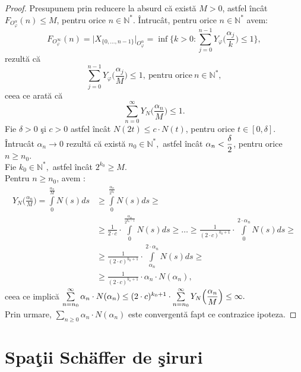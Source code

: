 \documentclass[ a4paper, 12pt]{report}
\theoremstyle{definition}
\theoremstyle{remark}
\numberwithin{equation}{section}
\begin{document}
\begin{proof}
Presupunem prin reducere la absurd c\u a exist\u a $M > 0$, astfel \^inc\^at $F_{O_{\varphi}^{\alpha}}(n) \leq M$, pentru orice $n \in \mathbb{N}^{\ast}$. \^Intruc\^at, pentru orice $n \in \mathbb{N}^{\ast}$ avem: \[F_{O_{\varphi}^{\infty}}(n) = \lvert X_{\{0,\ldots,n-1 \}} \rvert_{O_{\varphi}^{\alpha}} = \inf\Big\{ k>0 : \sum\limits_{j=0}^{n-1} Y_\varphi \Big(\frac{\alpha_j}{k}\Big) \leq 1\Big\},\] rezult\u a c\u a \[\sum\limits_{j=0}^{n-1} Y_\varphi\Big(\frac{\alpha_j}{M}\Big) \leq 1,\ \mbox{pentru orice}\  n \in \mathbb{N}^{\ast},\] ceea ce arat\u a c\u a \[\sum\limits_{n=0}^{\infty}Y_N\Big(\frac{\alpha_n}{M}\Big) \leq 1.\]
Fie $\delta>0$ \c si $c > 0$ astfel \^inc\^at $N(2t) \leq c \cdot N(t)$, pentru orice $t \in [0,\delta]$. \^Intruc\^at $\alpha_n \longrightarrow 0$  rezult\u a c\u a exist\u a $n_0 \in \mathbb{N}^{\ast},$ astfel \^inc\^at $\alpha_n < \displaystyle\frac{\delta}{2}$, pentru orice $n \geq n_0.$\\
Fie $k_0 \in \mathbb{N}^{\ast},$ astfel \^inc\^at $2^{k_{0}} \geq M.$ \\
Pentru $n \geq n_0$, avem :
\begin{align*}
Y_N\Big(\frac{\alpha_n}{M}\Big) = \int\limits_0^{\frac{\alpha_n}{M}} N(s)ds&\geq\int\limits_0^{\frac{\alpha_n}{2^{k_{0}}}} N(s) ds \geq\\
 &\geq \frac{1}{2 \cdot c}\cdot\!\! \int\limits_{0}^{\frac{\alpha_n}{2^{k_{0}-1}}}\!\! N(s)ds\geq \ldots \geq \frac{1}{(2 \cdot c)^{k_{0}+1}} \cdot\!\! \int\limits_{0}^{2 \cdot \alpha_n}\!\! N(s)ds \geq\\
   &\geq \frac{1}{(2 \cdot c)^{k_{0}+1}} \cdot \int\limits_{\alpha_n}^{2 \cdot \alpha_n}N(s)ds \geq\\
   &\geq \frac{1}{(2 \cdot c)^{k_{o}+1}} \cdot \alpha_n \cdot N(\alpha_n),
\end{align*} ceea ce implic\u a  $\sum\limits_{n=n_0}^{\infty} \alpha_n \cdot N(\alpha_n) \leq (2 \cdot c)^{k_{0}+1} \cdot \sum\limits_{n=n_0}^{\infty} Y_N\Big(\displaystyle\frac{\alpha_n}{M}\Big) \leq \infty.$\\
Prin urmare, $\sum\limits_{n \geq 0} \alpha_n \cdot N(\alpha_n)$ este convergent\u a  fapt ce contrazice ipoteza.
\end{proof}


\section{Spa\c tii Sch\" affer de \c siruri}

$\,$
\end{document}
